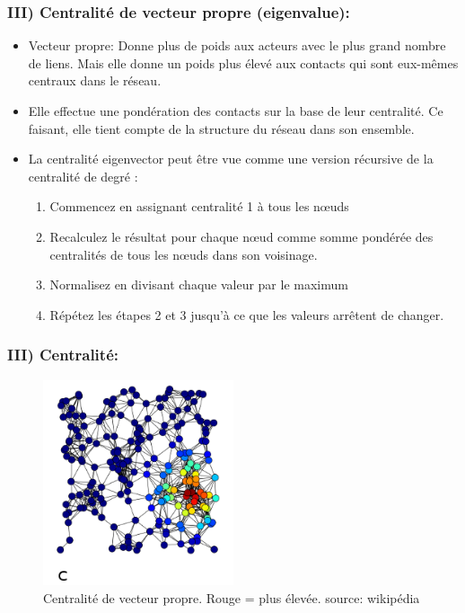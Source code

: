 \documentclass{beamer}
\begin{document}
\begin{frame}
    \frametitle{III) Centralité de vecteur propre (eigenvalue):}
    \begin{itemize}
        \item Vecteur propre: Donne plus de poids aux acteurs avec le plus grand nombre de liens. Mais elle donne un poids plus élevé aux contacts qui sont eux-mêmes centraux dans le réseau.
        \item Elle effectue une pondération des contacts sur la base de leur centralité. Ce faisant, elle tient compte de la structure du réseau dans son ensemble.
        \item La centralité eigenvector peut être vue comme une version récursive de la centralité de degré : \begin{enumerate}
            \item Commencez en assignant centralité 1 à tous les nœuds
            \item Recalculez le résultat pour chaque nœud comme somme pondérée des centralités de tous les nœuds dans son voisinage.
            \item Normalisez en divisant chaque valeur par le maximum
            \item Répétez les étapes 2 et 3 jusqu’à ce que les valeurs arrêtent de changer.
        \end{enumerate}
    \end{itemize}
\end{frame}

\begin{frame}
    \frametitle{III) Centralité:}
    \begin{figure}
        \centering
        \includegraphics[width = 0.5\textwidth]{vecteur_propre.png}
        \caption{\small{Centralité de vecteur propre. Rouge = plus élevée. source: wikipédia}}
      \end{figure}
\end{frame}
\end{document}

